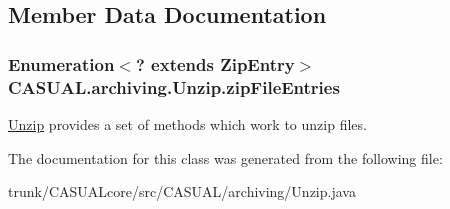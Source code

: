 \subsection{Member Data Documentation}
\hypertarget{classCASUAL_1_1archiving_1_1Unzip_a9baca609154eb94b13e456d523d17eab}{
\subsubsection[{zip\-File\-Entries}]{\setlength{\rightskip}{0pt plus 5cm}Enumeration$<$? extends Zip\-Entry$>$ C\-A\-S\-U\-A\-L.\-archiving.\-Unzip.\-zip\-File\-Entries}}\label{classCASUAL_1_1archiving_1_1Unzip_a9baca609154eb94b13e456d523d17eab}
\hyperlink{classCASUAL_1_1archiving_1_1Unzip}{Unzip} provides a set of methods which work to unzip files. 

The documentation for this class was generated from the following file\-:\begin{DoxyCompactItemize}
\item 
trunk/\-C\-A\-S\-U\-A\-Lcore/src/\-C\-A\-S\-U\-A\-L/archiving/Unzip.\-java\end{DoxyCompactItemize}
